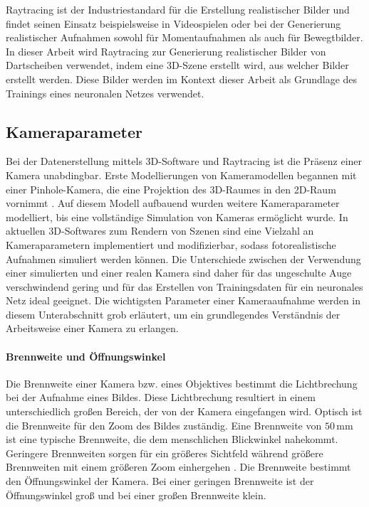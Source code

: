 Raytracing ist der Industriestandard für die Erstellung realistischer Bilder und findet seinen Einsatz beispielsweise in Videospielen oder bei der Generierung realistischer Aufnahmen sowohl für Momentaufnahmen als auch für Bewegtbilder. In dieser Arbeit wird Raytracing zur Generierung realistischer Bilder von Dartscheiben verwendet, indem eine 3D-Szene erstellt wird, aus welcher Bilder erstellt werden. Diese Bilder werden im Kontext dieser Arbeit als Grundlage des Trainings eines neuronalen Netzes verwendet.


\subsection{Kameraparameter}
\label{sec:kameras}

Bei der Datenerstellung mittels 3D-Software und Raytracing ist die Präsenz einer Kamera unabdingbar. Erste Modellierungen von Kameramodellen begannen mit einer Pinhole-Kamera, die eine Projektion des 3D-Raumes in den 2D-Raum vornimmt \cite{pinhole_camera}. Auf diesem Modell aufbauend wurden weitere Kameraparameter modelliert, bis eine vollständige Simulation von Kameras ermöglicht wurde. In aktuellen 3D-Softwares zum Rendern von Szenen sind eine Vielzahl an Kameraparametern implementiert und modifizierbar, sodass fotorealistische Aufnahmen simuliert werden können. Die Unterschiede zwischen der Verwendung einer simulierten und einer realen Kamera sind daher für das ungeschulte Auge verschwindend gering und für das Erstellen von Trainingsdaten für ein neuronales Netz ideal geeignet. Die wichtigsten Parameter einer Kameraaufnahme werden in diesem Unterabschnitt grob erläutert, um ein grundlegendes Verständnis der Arbeitsweise einer Kamera zu erlangen.

\paragraph{Brennweite und Öffnungswinkel}

Die Brennweite einer Kamera bzw. eines Objektives bestimmt die Lichtbrechung bei der Aufnahme eines Bildes. Diese Lichtbrechung resultiert in einem unterschiedlich großen Bereich, der von der Kamera eingefangen wird. Optisch ist die Brennweite für den Zoom des Bildes zuständig. Eine Brennweite von $50\,\text{mm}$ ist eine typische Brennweite, die dem menschlichen Blickwinkel nahekommt. Geringere Brennweiten sorgen für ein größeres Sichtfeld während größere Brennweiten mit einem größeren Zoom einhergehen \cite{focal_lentgh}. Die Brennweite bestimmt den Öffnungswinkel der Kamera. Bei einer geringen Brennweite ist der Öffnungswinkel groß und bei einer großen Brennweite klein.


